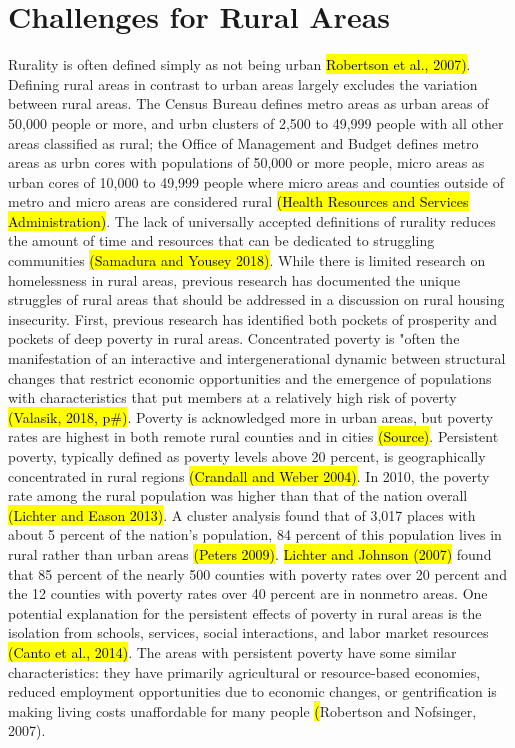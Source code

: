 \section{Challenges for Rural Areas}

 Rurality is often defined simply as not being urban \hl{Robertson et al., 2007)}. Defining rural areas in contrast to urban areas largely excludes the variation between rural areas. The Census Bureau defines metro areas as urban areas of 50,000 people or more, and urbn clusters of 2,500 to 49,999 people with all other areas classified as rural; the Office of Management and Budget defines metro areas as urbn cores with populations of 50,000 or more people, micro areas as urban cores of 10,000 to 49,999 people where micro areas and counties outside of metro and micro areas are considered rural  \hl{(Health Resources and Services Administration)}. The lack of universally accepted definitions of rurality reduces the amount of time and resources that can be dedicated to struggling communities \hl{(Samadura and Yousey 2018)}. While there is limited research on homelessness in rural areas, previous research has documented the unique struggles of rural areas that should be addressed in a discussion on rural housing insecurity. First, previous research has identified both pockets of prosperity and pockets of deep poverty in rural areas. Concentrated poverty is "often the manifestation of an interactive and intergenerational dynamic between structural changes that restrict economic opportunities and the emergence of populations with characteristics that put members at a relatively high risk of poverty \hl{(Valasik, 2018, p\#)}. Poverty is acknowledged more in urban areas, but poverty rates are highest in both remote rural counties and in cities \hl{(Source)}. Persistent poverty, typically defined as poverty levels above 20 percent, is geographically concentrated in rural regions \hl{(Crandall and Weber 2004)}. In 2010, the poverty rate among the rural population was higher than that of the nation overall \hl{(Lichter and Eason 2013)}. A cluster analysis found that of 3,017 places with about 5 percent of the nation's population, 84 percent of this population lives in rural rather than urban areas \hl{(Peters 2009)}. \hl{Lichter and Johnson (2007)} found that 85 percent of the nearly 500 counties with poverty rates over 20 percent and the 12 counties with poverty rates over 40 percent are in nonmetro areas. One potential explanation for the persistent effects of poverty in rural areas is the isolation from schools, services, social interactions, and labor market resources \hl{(Canto et al., 2014)}. The areas with persistent poverty have some similar characteristics: they have primarily agricultural or resource-based economies, reduced employment opportunities due to economic changes, or gentrification is making living costs unaffordable for many people \hl(Robertson and Nofsinger, 2007). 
 
